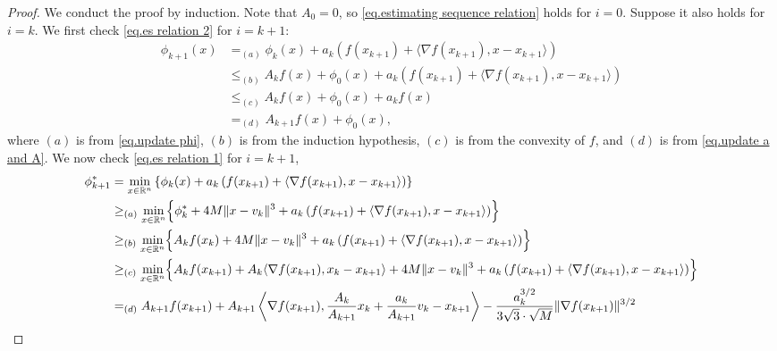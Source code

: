 \documentclass{article}
\numberwithin{equation}{section}
\numberwithin{equation}{section}
\begin{document}
\begin{proof}
    We conduct the proof by induction. Note that $A_0 = 0$, so \eqref{eq.estimating sequence relation} holds for $i=0$. Suppose it also holds for $i=k$.
    We first check \eqref{eq.es relation 2} for $i=k+1$:
    \begin{align*}
        \phi_{k+1}(x) & =_{(a)}\phi_k(x)+a_k\left(f(x_{k+1})+\langle \nabla f(x_{k+1}),x-x_{k+1}\rangle \right)               \\
                      & \leq_{(b)} A_k f(x)+\phi_0(x) +a_k\left(f(x_{k+1})+\langle \nabla f(x_{k+1}),x-x_{k+1}\rangle \right) \\
                      & \leq_{(c)} A_k f(x)+\phi_0(x) +a_k f(x)                                                               \\
                      & =_{(d)}A_{k+1} f(x)+\phi_0(x),
    \end{align*}
    where $(a)$ is from \eqref{eq.update phi}, $(b)$ is from the induction hypothesis, $(c)$ is from the convexity of $f$, and $(d)$ is from \eqref{eq.update a and A}.
    We now check \eqref{eq.es relation 1} for $i=k+1$,
    \begin{align*}
        \phi_{k+1}^*
         & = \min_{x\in\mathbb{R}^n} \left\{ \phi_k(x) + a_k \left(f(x_{k+1}) + \langle \nabla f(x_{k+1}), x - x_{k+1} \rangle \right) \right\}                                                                                        \\
         & \geq_{(a)} \min_{x\in\mathbb{R}^n} \Bigl\{ \phi_k^* + 4M \|x - v_k\|^3
        + a_k \left(f(x_{k+1}) + \langle \nabla f(x_{k+1}), x - x_{k+1} \rangle \right) \Bigr\}                                                                                                                                        \\
         & \geq_{(b)} \min_{x\in\mathbb{R}^n} \Bigl\{ A_k f(x_k) + 4M \|x - v_k\|^3
        + a_k \left(f(x_{k+1}) + \langle \nabla f(x_{k+1}), x - x_{k+1} \rangle \right) \Bigr\}                                                                                                                                        \\
         & \geq_{(c)} \min_{x\in\mathbb{R}^n} \Bigl\{ A_k f(x_{k+1}) + A_k \langle \nabla f(x_{k+1}), x_k - x_{k+1} \rangle + 4M \|x - v_k\|^3 + a_k \left(f(x_{k+1}) + \langle \nabla f(x_{k+1}), x - x_{k+1} \rangle \right) \Bigr\} \\
         & =_{(d)} A_{k+1} f(x_{k+1})
        + A_{k+1} \left\langle \nabla f(x_{k+1}),
        \frac{A_k}{A_{k+1}} x_k + \frac{a_k}{A_{k+1}} v_k - x_{k+1} \right\rangle - \frac{a_k^{3/2}}{3\sqrt{3} \cdot \sqrt{M}} \|\nabla f(x_{k+1})\|^{3/2}                                                                             \\

\end{align*}
\end{proof}
\end{document}
